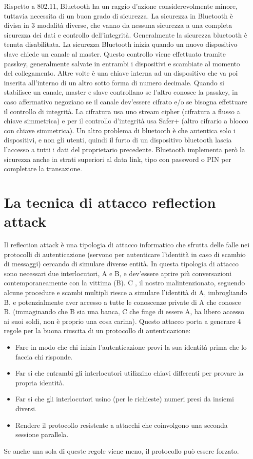 Rispetto a 802.11, Bluetooth ha un raggio d’azione considerevolmente minore, tuttavia necessita di un buon grado di sicurezza.
La sicurezza in Bluetooth è divisa in 3 modalità diverse, che vanno da nessuna sicurezza a una completa sicurezza dei dati e controllo dell’integrità.
Generalmente la sicurezza bluetooth è tenuta disabilitata.
La sicurezza Bluetooth inizia quando un nuovo dispositivo slave chiede un canale al master.
Questo controllo viene effettuato tramite passkey, generalmente salvate in entrambi i dispositivi e scambiate al momento del collegamento. Altre volte è una chiave interna ad un dispositivo che va poi inserita all’interno di un altro sotto forma di numero decimale.
Quando si stabilisce un canale, master e slave controllano se l’altro conosce la passkey, in caso affermativo negoziano se il canale dev’essere cifrato e/o se bisogna effettuare il controllo di integrità.
La cifratura usa uno stream cipher (cifratura a flusso a chiave simmetrica) e per il controllo d’integrità usa Safer+ (altro cifrario a blocco con chiave simmetrica).
Un altro problema di bluetooth è che autentica solo i dispositivi, e non gli utenti, quindi il furto di un dispositivo bluetooth lascia l’accesso a tutti i dati del proprietario precedente.
Bluetooth implementa però la sicurezza anche in strati superiori al data link, tipo con password o PIN per completare la transazione.

\section{La tecnica di attacco reflection attack}

Il reflection attack è una tipologia di attacco informatico che sfrutta delle falle nei protocolli di autenticazione (servono per autenticare l’identità in caso di scambio di messaggi) cercando di simulare diverse entità.
In questa tipologia di attacco sono necessari due interlocutori, A e B, e dev’essere aprire più conversazioni contemporaneamente con la vittima (B).
C , il nostro malintenzionato, seguendo alcune procedure e scambi multipli riesce a simulare l’identità di A, imbrogliando B, e potenzialmente aver accesso a tutte le conoscenze private di A che conosce B. (immaginando che B sia una banca, C che finge di essere A, ha libero accesso ai suoi soldi, non è proprio una cosa carina).
Questo attacco porta a generare 4 regole per la buona riuscita di un protocollo di autenticazione:
\begin{itemize}
\item	Fare in modo che chi inizia l’autenticazione provi la sua identità prima che lo faccia chi risponde.
\item	Far si che entrambi gli interlocutori utilizzino chiavi differenti per provare la propria identità.
\item	Far si che gli interlocutori usino (per le richieste) numeri presi da insiemi diversi.
\item	Rendere il protocollo resistente a attacchi che coinvolgono una seconda sessione parallela.
\end{itemize}
Se anche una sola di queste regole viene meno, il protocollo può essere forzato.

